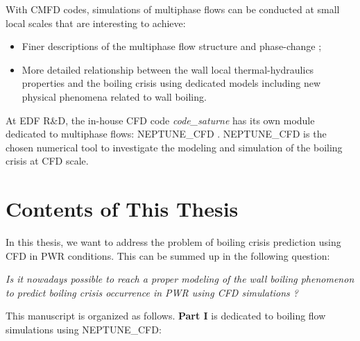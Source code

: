 With CMFD codes, simulations of multiphase flows can be conducted at small local scales that are interesting to achieve:
\begin{itemize}
\item Finer descriptions of the multiphase flow structure and phase-change ;\
\item More detailed relationship between the wall local thermal-hydraulics properties and the boiling crisis using dedicated models including new physical phenomena related to wall boiling.
\end{itemize} 

At EDF R\&D, the in-house CFD code \textit{code\_saturne} has its own module dedicated to multiphase flows: NEPTUNE\_CFD \cite{guelfi_neptune_2007}. NEPTUNE\_CFD is the chosen numerical tool to investigate the modeling and simulation of the boiling crisis at CFD scale.


\section{Contents of This Thesis}

In this thesis, we want to address the problem of boiling crisis prediction using CFD in PWR conditions. This can be summed up in the following question:

\npar

\begin{center}
\textit{Is it nowadays possible to reach a proper modeling of the wall boiling phenomenon to predict boiling crisis occurrence in PWR using CFD simulations ?}
\end{center}
%
%
%
%
%
%

\npar

This manuscript is organized as follows. \textbf{Part I} is dedicated to boiling flow simulations using NEPTUNE\_CFD:

